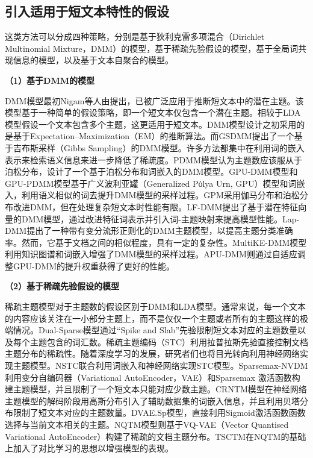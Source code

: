 \subsection{引入适用于短文本特性的假设}
这类方法可以分成四种策略\cite{STTM,XSJMXQQ}，分别是基于狄利克雷多项混合（Dirichlet Multinomial Mixture，DMM）的模型，基于稀疏先验假设的模型，基于全局词共现信息的模型，以及基于文本自聚合的模型。

\textbf{（1）基于DMM的模型}

DMM\cite{DMM}模型最初Nigam等人由提出，已被广泛应用于推断短文本中的潜在主题。该模型基于一种简单的假设策略，即一个短文本仅包含一个潜在主题。相较于LDA模型假设一个文本包含多个主题，这更适用于短文本。DMM模型设计之初采用的是基于Expectation–Maximization（EM）的推断算法。而GSDMM\cite{GSDMM}提出了一个基于吉布斯采样（Gibbs Sampling）的DMM模型。许多方法都集中在利用词的嵌入表示来检索语义信息来进一步降低了稀疏度。PDMM\cite{PDMM}模型认为主题数应该服从于泊松分布，设计了一个基于泊松分布和词嵌入的DMM模型。GPU-DMM\cite{GPUDMM}模型和GPU-PDMM\cite{PDMM}模型基于广义波利亚罐（Generalized Pόlya Urn, GPU）模型和词嵌入，利用语义相似的词去提升DMM模型的采样过程。GPM\cite{GPM}采用伽马分布和泊松分布改进DMM，但在处理复杂短文本时性能有限。LF-DMM\cite{LFDMM}提出了基于潜在特征向量的DMM模型，通过改进特征词表示并引入词-主题映射来提高模型性能。Lap-DMM\cite{LAPDMM}提出了一种带有变分流形正则化的DMM主题模型，以提高主题分类准确率。然而，它基于文档之间的相似程度，具有一定的复杂性。MultiKE-DMM\cite{MKEDMM}模型利用知识图谱和词嵌入增强了DMM模型的采样过程。APU-DMM\cite{APUDMM}则通过自适应调整GPU-DMM的提升权重获得了更好的性能。

\textbf{（2）基于稀疏先验假设的模型}

稀疏主题模型对于主题数的假设区别于DMM和LDA模型。通常来说，每一个文本的内容应该关注在一小部分主题上，而不是仅仅一个主题或者所有的主题这样的极端情况。Dual-Sparse\cite{DualSparse}模型通过“Spike and Slab”\cite{SpikeSlab}先验限制短文本对应的主题数量以及每个主题包含的词汇数。稀疏主题编码\cite{STC}（STC）利用拉普拉斯先验直接控制文档主题分布的稀疏性。随着深度学习的发展，研究者们也将目光转向利用神经网络实现主题模型。NSTC\cite{NSTC}联合利用词嵌入和神经网络实现STC模型。Sparsemax-NVDM\cite{SparseMax,NVDM}利用变分自编码器\cite{VAE}（Variational AutoEncoder，VAE）和Sparsemax 激活函数构建主题模型，并且限制了一个短文本只能对应少数主题。CRNTM\cite{CRNTM}模型在神经网络主题模型的解码阶段用高斯分布引入了辅助数据集的词嵌入信息，并且利用贝塔分布限制了短文本对应的主题数量。DVAE.Sp\cite{DVAE}模型，直接利用Sigmoid激活函数函数选择与当前文本相关的主题。NQTM\cite{NQTM}模型则基于VQ-VAE\cite{VQVAE}（Vector Quantised Variational AutoEncoder）构建了稀疏的文档主题分布。TSCTM\cite{TSCTM}在NQTM的基础上加入了对比学习的思想以增强模型的表现。


